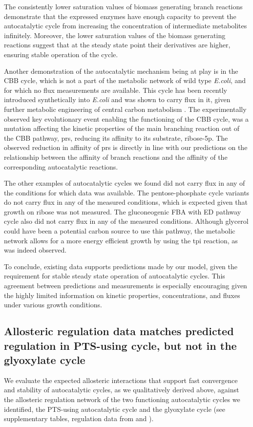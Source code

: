     The consistently lower saturation values of biomass generating branch reactions demonstrate that the expressed enzymes have enough capacity to prevent the autocatalytic cycle from increasing the concentration of intermediate metabolites infinitely.
    Moreover, the lower saturation values of the biomass generating reactions suggest that at the steady state point their derivatives are higher, ensuring stable operation of the cycle.

    Another demonstration of the autocatalytic mechanism being at play is in the CBB cycle, which is not a part of the metabolic network of wild type \emph{E.coli}, and for which no flux measurements are available.
    This cycle has been recently introduced synthetically into \emph{E.coli} and was shown to carry flux in it, given further metabolic engineering of central carbon metabolism \cite{Antonovsky2016-jy}.
    The experimentally observed key evolutionary event enabling the functioning of the CBB cycle, was a mutation affecting the kinetic properties of the main branching reaction out of the CBB pathway, prs, reducing its affinity to its substrate, ribose-5p.
    The observed reduction in affinity of prs is directly in line with our predictions on the relationship between the affinity of branch reactions and the affinity of the corresponding autocatalytic reactions.

    The other examples of autocatalytic cycles we found did not carry flux in any of the conditions for which data was available.
    The pentose-phosphate cycle variants do not carry flux in any of the measured conditions, which is expected given that growth on ribose was not measured.
    The gluconeogenic FBA with ED pathway cycle also did not carry flux in any of the measured conditions.
    Although glycerol could have been a potential carbon source to use this pathway, the metabolic network allows for a more energy efficient growth by using the tpi reaction, as was indeed observed.

    To conclude, existing data supports predictions made by our model, given the requirement for stable steady state operation of autocatalytic cycles.
    This agreement between predictions and measurements is especially encouraging given the highly limited information on kinetic properties, concentrations, and fluxes under various growth conditions.

    \subsection{Allosteric regulation data matches predicted regulation in PTS-using cycle, but not in the glyoxylate cycle}
    We evaluate the expected allosteric interactions that support fast convergence and stability of autocatalytic cycles, as we qualitatively derived above, against the allosteric regulation network of the two functioning autocatalytic cycles we identified, the PTS-using autocatalytic cycle and the glyoxylate cycle (see supplementary tables, regulation data from \cite{Keseler2013-xn} and \cite{Schomburg2004-st}).

